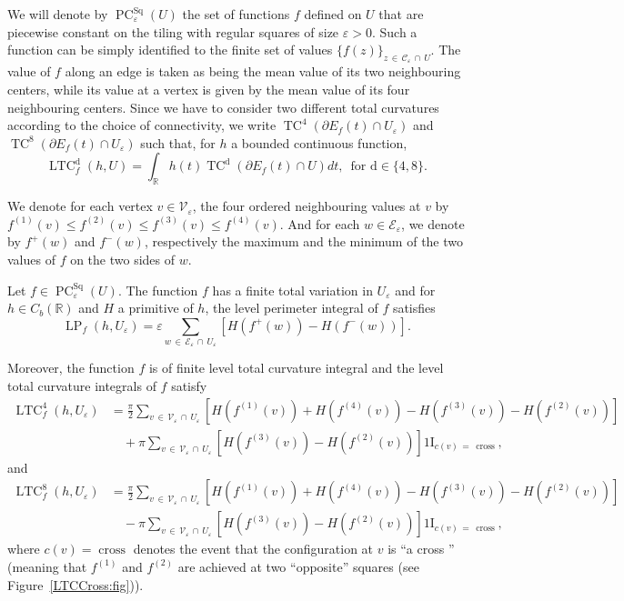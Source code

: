 \documentclass[AHL,Unicode,longabstracts,published]{cedram}
\newcommand{\R}{\mathbb{R}}
\newcommand{\ind}{{1\!\!\mathrm{I}}}
\newcommand{\eps}{\varepsilon}
\DeclareMathOperator{\TC}{TC}
\DeclareMathOperator{\LTC}{LTC}
\DeclareMathOperator{\LP}{LP}
\DeclareMathOperator{\PC}{PC}
\newcommand{\dd}{\mathrm{d}}
\DeclareMathOperator{\Sq}{Sq}
\DeclareMathOperator{\cross}{cross}
\newcommand{\calC}{\mathcal{C}}
\newcommand{\calV}{\mathcal{V}}
\newcommand{\calE}{\mathcal{E}}
\begin{document}

We will denote by $\PC^{\Sq}_\eps(U)$ the set of functions $f$ defined on $U$ that are piecewise constant on the tiling with regular squares of size $\eps>0$. Such a function can be simply identified to the finite set of values $\{f(z) \}_{z\,\in\,\calC_\eps\,\cap\,U}$. The value of $f$ along an edge is taken as being the mean value of its two neighbouring centers, while its value at a vertex is given by the mean value of its four neighbouring centers. Since we have to consider two different total curvatures according to the choice of connectivity, we write $\TC^4(\partial E_f(t) \cap U_\eps)$ and $\TC^8(\partial E_f(t)\cap U_\eps)$ such that, for $h$ a bounded continuous function,
\begin{equation}\label{TCsquare}
\LTC^\dd_f(h,U)=\int_{\R}h(t) \TC^\dd\left(\partial E_f(t)\cap U\right) dt,\,\text{ for } \dd\in\{4,8\}.
\end{equation}

We denote for each vertex $v\in {\calV}_\varepsilon$, the four ordered neighbouring values at $v$ by $f^{(1)}(v)\le f^{(2)}(v)\le f^{(3)}(v) \le f^{(4)}(v)$. And for each $w\in\calE_\eps$, we denote by $f^+(w)$ and $f^-(w)$, respectively the maximum and the minimum of the two values of $f$ on the two sides of $w$.


\begin{prop}\label{level-int-discr-square:prop}
Let $f\in\PC^{\Sq}_\eps(U)$. The function $f$ has a finite total variation in $U_\eps$ and for $h \in C_b(\R)$ and $H$ a primitive of $h$, the level perimeter integral of $f$ satisfies
\[
\LP_f(h,U_\eps)= \eps \sum_{w\,\in\,\calE_\eps\,\cap \,U_\eps} \left[H\left(f^+(w)\right) - H\left(f^-(w)\right)\right].
\]

Moreover, the function $f$ is of finite level total curvature integral and the level total curvature integrals of $f$ satisfy
\begin{align*}
\LTC^4_{f}(h,U_\eps) & = \frac{\pi}{2} \sum_{v\,\in\, \calV_\varepsilon\,\cap\,U_\eps} \left[H\left(f^{(1)}(v)\right) + H\left(f^{(4)}(v)\right)- H\left(f^{(3)}(v)\right) - H\left(f^{(2)}(v)\right)\right] \\
&\quad+ \pi \sum_{v\,\in\,\calV_\eps\,\cap\,U_\eps} \left[H\left(f^{(3)}(v)\right) - H\left(f^{(2)}(v)\right)\right]\ind_{c(v)\,=\,\cross},
\end{align*}
and
\begin{align*}
\LTC^8_{f}(h,U_\eps) & = \frac{\pi}{2} \sum_{v\,\in\, \calV_\varepsilon\,\cap\,U_\eps} \left[H\left(f^{(1)}(v)\right) + H\left(f^{(4)}(v)\right)- H\left(f^{(3)}(v)\right) - H\left(f^{(2)}(v)\right)\right] \\
&\quad - \pi
\sum_{v\,\in\,\calV_\eps\,\cap\,U_\eps} \left[H\left(f^{(3)}(v)\right) - H\left(f^{(2)}(v)\right)\right]
\ind_{c(v)\,=\,\cross},
\end{align*}
where $c(v)=\cross$ denotes the event that the configuration at $v$ is ``a cross '' (meaning that $f^{(1)}$ and $f^{(2)}$ are achieved at two ``opposite'' squares (see Figure~\ref{LTCCross:fig})).
\end{prop}
\end{document}
